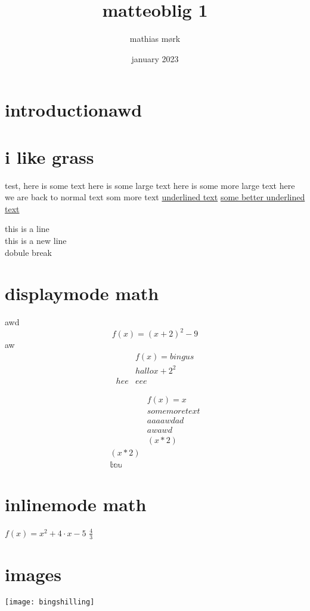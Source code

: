 ﻿\documentclass[14]{article}
\title{matteoblig 1}
\author{mathias mørk}
\date{january 2023}
\begin{document}
    \maketitle
    \begin{center}
    
    \section{introductionawd}

    \section{i like grass}
    
    
    test, here is some text {\large here is some large text}
    \large here is some more large text 
    \normalsize here we are back to normal text
    som more text
    \underline{underlined text}
    \uline{some better underlined text}
    
    this is a line \\ this is a new line \\[2\baselineskip] dobule break
    
    \section{displaymode math}
    awd
    \[f(x)=(x+2)^2 - 9\]    
    aw
    \begin{align*} 
        & f(x)= bingus \\
        & hallo x +2^2 \\
         hee&eee
    \end{align*}
    
    \begin{align}
        & f(x) = x \\
        & some more text \\
        & aaaa wdad \nonumber \\ 
        & awawd \\
        & \left(  x*2 \right) \\
        \left(  x*2 \right) \\
        \mathbb{tau}
    \end{align}
        
    \section{inlinemode math}
    \(f(x) = x^2 + 4 \cdot x - 5 \)
    \(\frac{4}{3}\)
        
    
    \section{images}
    \graphicspath{{images/}}
    \texttt{[image: bingshilling]}    
    \end{center}
\end{document}
